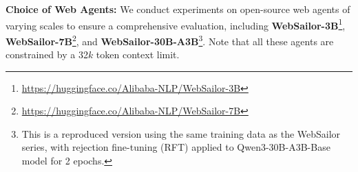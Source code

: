 \textbf{Choice of Web Agents:} We conduct experiments on open-source web agents of varying scales to ensure a comprehensive evaluation, including \textbf{WebSailor-3B}\footnote{\href{https://huggingface.co/Alibaba-NLP/WebSailor-3B}{https://huggingface.co/Alibaba-NLP/WebSailor-3B}}, \textbf{WebSailor-7B}\footnote{\href{https://huggingface.co/Alibaba-NLP/WebSailor-7B}{https://huggingface.co/Alibaba-NLP/WebSailor-7B}}, and \textbf{WebSailor-30B-A3B}\footnote{This is a reproduced version using the same training data as the WebSailor series, with rejection fine-tuning (RFT) applied to Qwen3-30B-A3B-Base model for 2 epochs.}. Note that all these agents are constrained by a 32$k$ token context limit.


\begin{table}[!t]
    \centering
    \caption{\textbf{Performance comparison (in \%) between paradigms under training-free settings.} \textbf{MEM1} is evaluated exclusively on WebSailor-30B due to the limited instruction-following capabilities of smaller backbones to suit such a paradigm. \colorbox{ours}{Blue} indicates results using ReSum with our developed ReSumTool-30B, which consistently outperforms baselines. \textbf{Bold} highlights the best results for each backbone agent. Results with $^{\dag}$ are sourced from \cite{liu2025webexplorer}, representing leading pre-trained models paired with search and visit tools to illustrate the datasets' performance landscape.}
\end{table}
